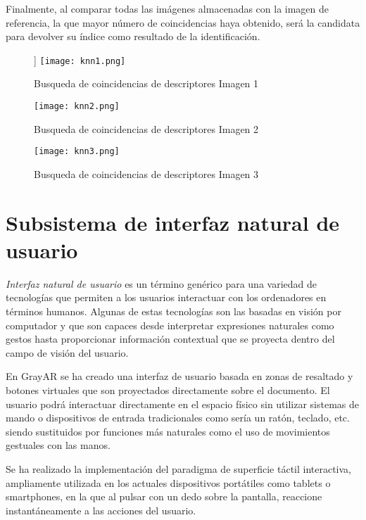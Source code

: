 Finalmente, al comparar todas las imágenes almacenadas con la imagen
de referencia, la que mayor número de coincidencias haya obtenido, será
la candidata para devolver su índice como resultado de la identificación.

  \begin{figure}] 
    \centering
    \texttt{[image: knn1.png]}
    \caption{Busqueda de coincidencias de descriptores Imagen 1}
    \label{fig:knn1}
  \end{figure}



  \begin{figure} 
    \centering
    \texttt{[image: knn2.png]}
    \caption{Busqueda de coincidencias de descriptores Imagen 2}
    \label{fig:knn2}
  \end{figure}



  \begin{figure} 
    \centering
    \texttt{[image: knn3.png]}
    \caption{Busqueda de coincidencias de descriptores Imagen 3}
    \label{fig:knn3}
  \end{figure}



\section{Subsistema de interfaz natural de usuario}

\emph{Interfaz natural de usuario} es un término genérico para una variedad de tecnologías que
permiten a los usuarios interactuar con los ordenadores en términos humanos. Algunas de
estas tecnologías son las basadas en visión por computador y que son
capaces desde interpretar expresiones naturales como gestos hasta proporcionar información contextual que se
proyecta dentro del campo de visión del usuario.

En GrayAR se ha creado una interfaz de usuario basada en zonas de
resaltado y botones virtuales que son proyectados directamente sobre
el documento. El usuario podrá interactuar directamente en el espacio físico sin utilizar sistemas de mando o dispositivos de entrada tradicionales como sería un ratón,
teclado, etc. siendo sustituidos por funciones más naturales como el
uso de movimientos gestuales con las manos.

Se ha realizado la implementación del paradigma de superficie táctil interactiva,
ampliamente utilizada en los actuales dispositivos portátiles como
tablets o smartphones, en la que al pulsar con un dedo sobre la
pantalla, reaccione instantáneamente a las acciones del usuario.

